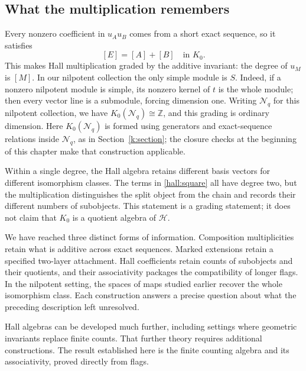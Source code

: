 \subsection{What the multiplication remembers}

Every nonzero coefficient in $u_Au_B$ comes from a short exact sequence,
so it satisfies
\[
[E]=[A]+[B]\quad\text{in }K_0.
\]
This makes Hall multiplication graded by the additive invariant: the
degree of $u_M$ is $[M]$. In our nilpotent collection the only simple
module is $S$. Indeed, if a nonzero nilpotent module is simple, its
nonzero kernel of $t$ is the whole module; then every vector line is a
submodule, forcing dimension one. Writing $\mathcal N_q$ for this
nilpotent collection, we have $K_0(\mathcal N_q)\cong\mathbb Z$, and
this grading is ordinary dimension. Here $K_0(\mathcal N_q)$ is formed
using generators and exact-sequence relations inside $\mathcal N_q$,
as in Section~\ref{k:section}; the closure checks at the beginning of
this chapter make that construction applicable.

Within a single degree, the Hall algebra retains different basis vectors
for different isomorphism classes. The terms in \eqref{hall:square} all
have degree two, but the multiplication distinguishes the split object
from the chain and records their different numbers of subobjects.
This statement is a grading statement; it does not claim that $K_0$ is
a quotient algebra of $\mathcal H$.

We have reached three distinct forms of information. Composition
multiplicities retain what is additive across exact sequences.
Marked extensions retain a specified two-layer attachment. Hall
coefficients retain counts of subobjects and their quotients, and their
associativity packages the compatibility of longer flags. In the
nilpotent setting, the spaces of maps studied earlier recover the whole
isomorphism class. Each construction answers a precise question about
what the preceding description left unresolved.

Hall algebras can be developed much further, including settings where
geometric invariants replace finite counts. That further theory requires
additional constructions. The result established here is the finite
counting algebra and its associativity, proved directly from flags.

